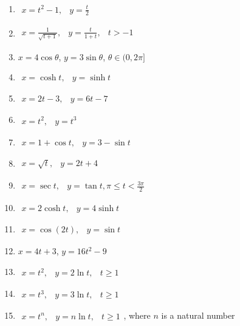 \documentclass{exercises}
\begin{document}
\begin{enumerate}[resume]
\item $\begin{matrix}x=t^{2}-1, & y=\frac{t}{2}\end{matrix}$
\item $\begin{matrix}x=\frac{1}{\sqrt{t+1}}, & y=\frac{t}{1+t}, & t>-1\end{matrix}$
\item $x=4\cos \theta$, $y=3\sin \theta$, $\theta\in(0,2\pi]$
\item $\begin{matrix}x=\cosh t, & y=\sinh t\end{matrix}$
\item $\begin{matrix}x=2t-3, & y=6t-7\end{matrix}$
\item $\begin{matrix}x=t^{2}, & y=t^{3}\end{matrix}$
\item $\begin{matrix}x=1+\cos t, & y=3-\sin t\end{matrix}$
\item $\begin{matrix}x=\sqrt{t}, & y=2t+4\end{matrix}$
\item $\begin{matrix}x=\sec t, & y=\tan t,\pi \le t<\frac{3\pi}{2}\end{matrix}$
\item $\begin{matrix}x=2\cosh t, & y=4\sinh t\end{matrix}$
\item $\begin{matrix}x=\cos(2t), & y=\sin t\end{matrix}$
\item $x=4t+3$, $y=16t^{2}-9$
\item $\begin{matrix}x=t^{2}, & y=2\ln t, & t\ge 1\end{matrix}$
\item $\begin{matrix}x=t^{3}, & y=3\ln t, & t\ge 1\end{matrix}$
\item $\begin{matrix}x=t^{n}, & y=n\ln t, & t\ge 1\end{matrix}$, where $n$ is a natural number

\end{enumerate}
\end{document}
